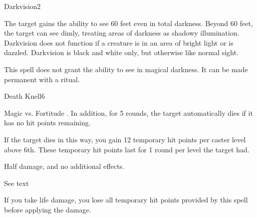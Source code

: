 \begin{spellsection}{Darkvision}{2}
\begin{spellheader}
\end{spellheader}
\begin{spellcontent}
    \begin{spelltargetinginfo}
    \end{spelltargetinginfo}
    \begin{spelleffects}
        \spelleffect The target gains the ability to see 60 feet even in total darkness. Beyond 60 feet, the target can see dimly, treating areas of darkness as shadowy illumination. Darkvision does not function if a creature is in an area of bright light or is dazzled. Darkvision is black and white only, but otherwise like normal sight.
        \spelldur \durlong
    \end{spelleffects}
\end{spellcontent}
\begin{spellfooter}
    \spellnotes This spell does not grant the ability to see in magical darkness. It can be made permanent with a  ritual.
\end{spellfooter}
\end{spellsection}

\begin{spellsection}{Death Knell}{6}
\begin{spellheader}
\end{spellheader}
\begin{spellcontent}
    \begin{spelltargetinginfo}
    \end{spelltargetinginfo}
    \begin{spelleffects}
        \begin{spellattack}{Magic vs. Fortitude}
            \spellsuccess {}. In addition, for 5 rounds, the target automatically dies if it has no hit points remaining.
            
            If the target dies in this way, you gain 12 temporary hit points  per caster level above 6th. These temporary hit points last for 1 round per level the target had.

            \spellfailure Half damage, and no additional effects.
        \end{spellattack}
        \spelldur See text
    \end{spelleffects}
\end{spellcontent}
\begin{spellfooter}
    \spellnotes If you take life damage, you lose all temporary hit points provided by this spell before applying the damage.
\end{spellfooter}
\end{spellsection}

